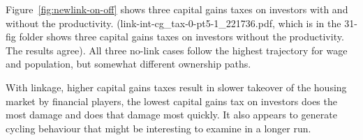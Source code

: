 \documentclass[]{article}
\begin{document}
Figure~\ref{fig:newlink-on-off} shows three capital gains taxes on investors  with and without the productivity. (link-int-cg\_tax-0-pt5-1\_221736.pdf, which is in the 31-fig folder  shows three capital gains taxes on investors  without the productivity. The results agree). All three no-link cases follow the highest trajectory for wage and population, but somewhat different ownership paths. 

With linkage, higher capital gains taxes result in slower takeover of the housing market by financial players, the lowest capital gains tax on investors does the most damage and does that damage most quickly. It also appears to generate cycling behaviour that might be interesting to examine in a longer run.


\end{document}
